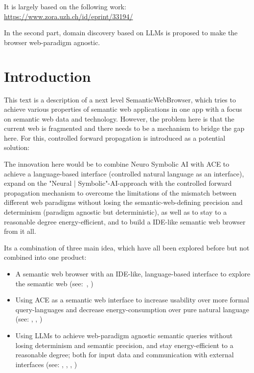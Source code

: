 \documentclass[12pt,a4paper]{article}
\begin{document}
It is largely based on the following work: \url{https://www.zora.uzh.ch/id/eprint/33194/}

In the second part, domain discovery based on LLMs is proposed to make the browser web-paradigm agnostic.

\section{Introduction}

This text is a description of a next level SemanticWebBrowser, which tries to achieve various properties of semantic web applications in one app with a focus on semantic web data and technology. However, the problem here is that the current web is fragmented and there needs to be a mechanism to bridge the gap here. For this, controlled forward propagation is introduced as a potential solution:

The innovation here would be to combine Neuro Symbolic AI with ACE to achieve a language-based interface (controlled natural language as an interface), expand on the "Neural | Symbolic"-AI-approach with the controlled forward propagation mechanism to overcome the limitations of the mismatch between different web paradigms without losing the semantic-web-defining precision and determinism (paradigm agnostic but deterministic), as well as to stay to a reasonable degree energy-efficient, and to build a IDE-like semantic web browser from it all.

Its a combination of three main idea, which have all been explored before but not combined into one product:

\begin{itemize}
    \item A semantic web browser with an IDE-like, language-based interface to explore the semantic web (see:~\cite{semanticWebBrowser}, \cite{headlessBrowsers})
    \item Using ACE as a semantic web interface to increase usability over more formal query-languages and decrease energy-consumption over pure natural language (see: \cite{semanticWebLanguageBased}, \cite{semanticWebControlledEnglish}, \cite{semanticWebAce})
    \item Using LLMs to achieve web-paradigm agnostic semantic queries without losing determinism and semantic precision, and stay energy-efficient to a reasonable degree; both for input data and communication with external interfaces (see: \cite{llmAsDataTranslator}, \cite{llmForIntegratingHeterogenousData}, \cite{neuroSymbolicAi}, \cite{domainDiscoveryTool})
\end{itemize}
\end{document}
